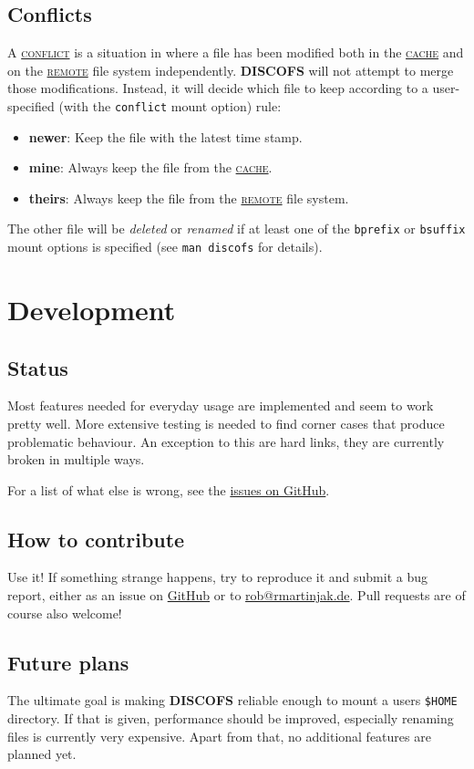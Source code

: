 \documentclass[a4paper]{article}
\makeatletter
\newcommand{\myemail}{\href{mailto:rob@rmartinjak.de}{rob@rmartinjak.de}\xspace}
\newcommand{\software}[1]{\textsc{\textbf{#1}}\xspace}
\newcommand{\discofs}{\software{DISCOFS}}
\newcommand{\github}{\href{https://github.com}{GitHub}\xspace}
\newcommand{\keyword}[1]{\hyperref[keyword:#1]{\textsc{#1}}\xspace}
\newcommand{\cache}{\keyword{cache}}
\newcommand{\remote}{\keyword{remote}}
\newcommand{\conflict}{\keyword{conflict}}
\makeatother
\begin{document}
\subsection{Conflicts} %
\label{keyword:conflict}
A \conflict is a situation in where a file has been modified both in the \cache
and on the \remote file system independently. \discofs will not attempt to merge
those modifications. Instead, it will decide which file to keep according to a
user-specified (with the \texttt{conflict} mount option) rule:
\begin{itemize}
	\item \textbf{newer}: Keep the file with the latest time stamp.
	\item \textbf{mine}: Always keep the file from the \cache.
	\item \textbf{theirs}: Always keep the file from the \remote file system.
\end{itemize}

The other file will be \emph{deleted} or \emph{renamed} if at least one of the
\texttt{bprefix} or \texttt{bsuffix} mount options is specified (see
\lstinline|man discofs| for details).




\section{Development} %

\subsection{Status}
Most features needed for everyday usage are implemented and seem to work pretty
well. More extensive testing is needed to find corner cases that produce
problematic behaviour. An exception to this are hard links, they are currently
broken in multiple ways.

For a list of what else is wrong, see the
\href{https://github.com/rmartinjak/discofs/issues}{issues on GitHub}.

\subsection{How to contribute}
Use it! If something strange happens, try to reproduce it and submit a bug
report, either as an issue on \github or to \myemail.
Pull requests are of course also welcome!

\subsection{Future plans}
The ultimate goal is making \discofs reliable enough to mount a users
\texttt{\$HOME} directory. If that is given, performance should be improved,
especially renaming files is currently very expensive.
Apart from that, no additional features are planned yet.
\end{document}
